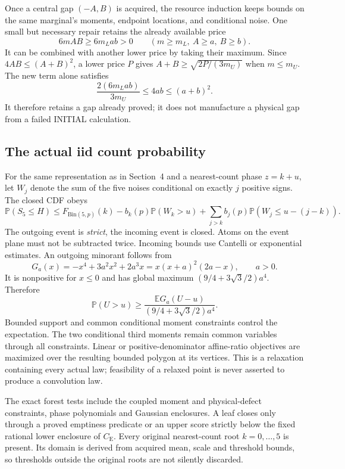 \documentclass[11pt,a4paper]{article}
\theoremstyle{definition}
\newcommand{\E}{\mathbb E}
\newcommand{\Pp}{\mathbb P}
\newcommand{\CE}{C_{\mathrm E}}
\begin{document}
Once a central gap $(-A,B)$ is acquired, the resource induction keeps
bounds on the same marginal's moments, endpoint locations, and conditional
noise. One small but necessary repair retains the already available price
\[
 6mAB\ge6m_L a b>0\qquad(m\ge m_L,\ A\ge a,\ B\ge b).
\]
It can be combined with another lower price by taking their maximum.
Since $4AB\le(A+B)^2$, a lower price $P$ gives
$A+B\ge\sqrt{2P/(3m_U)}$ when $m\le m_U$.
The new term alone satisfies
\[
 \frac{2(6m_Lab)}{3m_U}\le4ab\le(a+b)^2.
\]
It therefore retains a gap already proved; it does not manufacture a
physical gap from a failed INITIAL calculation.

\subsection{The actual iid count probability}
For the same representation as in Section~4 and a nearest-count phase
$z=k+u$, let $W_j$ denote the sum of the five noises conditional on
exactly $j$ positive signs. The closed CDF obeys
\begin{equation}\label{eq:outgoing}
 \Pp(S_5\le H)\le F_{\mathrm{Bin}(5,p)}(k)
 -b_k(p)\Pp(W_k>u)
 +\sum_{j>k}b_j(p)\Pp(W_j\le u-(j-k)).
\end{equation}
The outgoing event is \emph{strict}, the incoming event is closed. Atoms
on the event plane must not be subtracted twice.
Incoming bounds use Cantelli or exponential estimates. An outgoing
minorant follows from
\[
 G_a(x)=-x^4+3a^2x^2+2a^3x=x(x+a)^2(2a-x),\qquad a>0.
\]
It is nonpositive for $x\le0$ and has global maximum
$(9/4+3\sqrt3/2)a^4$. Therefore
\[
 \Pp(U>u)\ge\frac{\E G_a(U-u)}{(9/4+3\sqrt3/2)a^4}.
\]
Bounded support and common conditional moment constraints control the
expectation. The two conditional third moments remain common variables
through all constraints. Linear or positive-denominator affine-ratio
objectives are maximized over the resulting bounded polygon at its
vertices. This is a relaxation containing every actual law; feasibility
of a relaxed point is never asserted to produce a convolution law.

The exact forest tests include the coupled moment and physical-defect
constraints, phase polynomials and Gaussian enclosures. A leaf closes
only through a proved emptiness predicate or an upper score strictly below
the fixed rational lower enclosure of $\CE$. Every original nearest-count
root $k=0,\ldots,5$ is present. Its domain is derived from acquired mean,
scale and threshold bounds, so thresholds outside the original roots are
not silently discarded.
\end{document}
